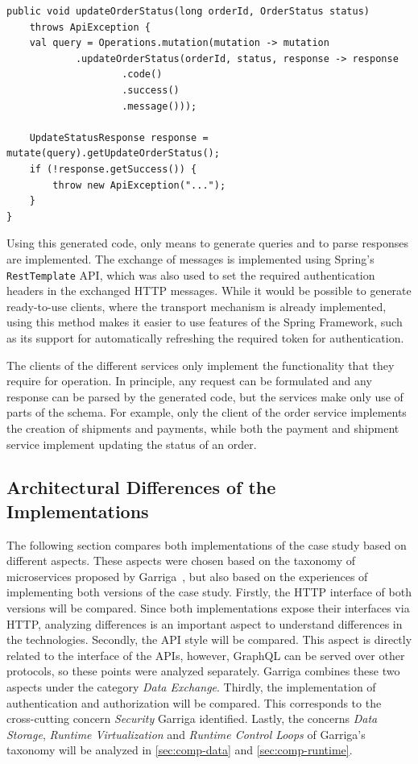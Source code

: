\begin{lstlisting}[style=java-ext, caption={Formulating Queries against GraphQL \acp{API} using GraphQLJavaGen}, label={lst:gql-mutation-java}]
public void updateOrderStatus(long orderId, OrderStatus status) 
    throws ApiException {
    val query = Operations.mutation(mutation -> mutation
            .updateOrderStatus(orderId, status, response -> response
                    .code()
                    .success()
                    .message()));

    UpdateStatusResponse response = mutate(query).getUpdateOrderStatus();
    if (!response.getSuccess()) {
        throw new ApiException("...");
    }
}
\end{lstlisting}

Using this generated code, only means to generate queries and to parse responses are implemented.
The exchange of messages is implemented using Spring's \texttt{RestTemplate} \ac{API}, which was also used to set the required authentication headers in the exchanged \ac{HTTP} messages.
While it would be possible to generate ready-to-use clients, where the transport mechanism is already implemented, using this method makes it easier to use features of the Spring Framework, such as its support for automatically refreshing the required token for authentication.

The clients of the different services only implement the functionality that they require for operation.
In principle, any request can be formulated and any response can be parsed by the generated code, but the services make only use of parts of the schema.
For example, only the client of the order service implements the creation of shipments and payments, while both the payment and shipment service implement updating the status of an order.

\subsection{Architectural Differences of the Implementations}

The following section compares both implementations of the case study based on different aspects.
These aspects were chosen based on the taxonomy of microservices proposed by Garriga~\cite{Garriga2017}, but also based on the experiences of implementing both versions of the case study.
Firstly, the \ac{HTTP} interface of both versions will be compared.
Since both implementations expose their interfaces via \ac{HTTP}, analyzing differences is an important aspect to understand differences in the technologies.
Secondly, the \ac{API} style will be compared.
This aspect is directly related to the interface of the \acp{API}, however, GraphQL can be served over other protocols, so these points were analyzed separately.
Garriga combines these two aspects under the category \textit{Data Exchange}.
Thirdly, the implementation of authentication and authorization will be compared.
This corresponds to the cross-cutting concern \textit{Security} Garriga identified.
Lastly, the concerns \textit{Data Storage}, \textit{Runtime Virtualization} and \textit{Runtime Control Loops} of Garriga's taxonomy will be analyzed in \autoref{sec:comp-data} and \autoref{sec:comp-runtime}.

